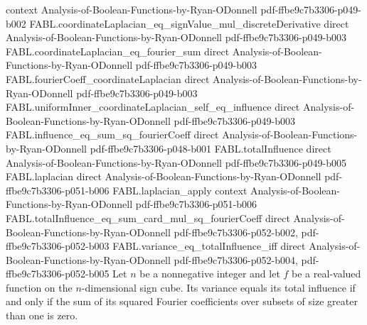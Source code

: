 \begin{theorem}
  {context}
  {Analysis-of-Boolean-Functions-by-Ryan-ODonnell}
  {pdf-ffbe9c7b3306-p049-b002}
\proofstep
  {FABL.coordinateLaplacian_eq_signValue_mul_discreteDerivative}
  {direct}
  {Analysis-of-Boolean-Functions-by-Ryan-ODonnell}
  {pdf-ffbe9c7b3306-p049-b003}
\proofstep
  {FABL.coordinateLaplacian_eq_fourier_sum}
  {direct}
  {Analysis-of-Boolean-Functions-by-Ryan-ODonnell}
  {pdf-ffbe9c7b3306-p049-b003}
\proofstep
  {FABL.fourierCoeff_coordinateLaplacian}
  {direct}
  {Analysis-of-Boolean-Functions-by-Ryan-ODonnell}
  {pdf-ffbe9c7b3306-p049-b003}
\proofstep
  {FABL.uniformInner_coordinateLaplacian_self_eq_influence}
  {direct}
  {Analysis-of-Boolean-Functions-by-Ryan-ODonnell}
  {pdf-ffbe9c7b3306-p049-b003}
\proofstep
  {FABL.influence_eq_sum_sq_fourierCoeff}
  {direct}
  {Analysis-of-Boolean-Functions-by-Ryan-ODonnell}
  {pdf-ffbe9c7b3306-p048-b001}
\proofstep
  {FABL.totalInfluence}
  {direct}
  {Analysis-of-Boolean-Functions-by-Ryan-ODonnell}
  {pdf-ffbe9c7b3306-p049-b005}
\proofstep
  {FABL.laplacian}
  {direct}
  {Analysis-of-Boolean-Functions-by-Ryan-ODonnell}
  {pdf-ffbe9c7b3306-p051-b006}
\proofstep
  {FABL.laplacian_apply}
  {context}
  {Analysis-of-Boolean-Functions-by-Ryan-ODonnell}
  {pdf-ffbe9c7b3306-p051-b006}
\proofstep
  {FABL.totalInfluence_eq_sum_card_mul_sq_fourierCoeff}
  {direct}
  {Analysis-of-Boolean-Functions-by-Ryan-ODonnell}
  {pdf-ffbe9c7b3306-p052-b002,
    pdf-ffbe9c7b3306-p052-b003}
\proofstep
  {FABL.variance_eq_totalInfluence_iff}
  {direct}
  {Analysis-of-Boolean-Functions-by-Ryan-ODonnell}
  {pdf-ffbe9c7b3306-p052-b004,
    pdf-ffbe9c7b3306-p052-b005}
Let $n$ be a nonnegative integer and let $f$ be a real-valued function on the
$n$-dimensional sign cube. Its variance equals its total influence if and only if the
sum of its squared Fourier coefficients over subsets of size greater than one is zero.
\end{theorem}


